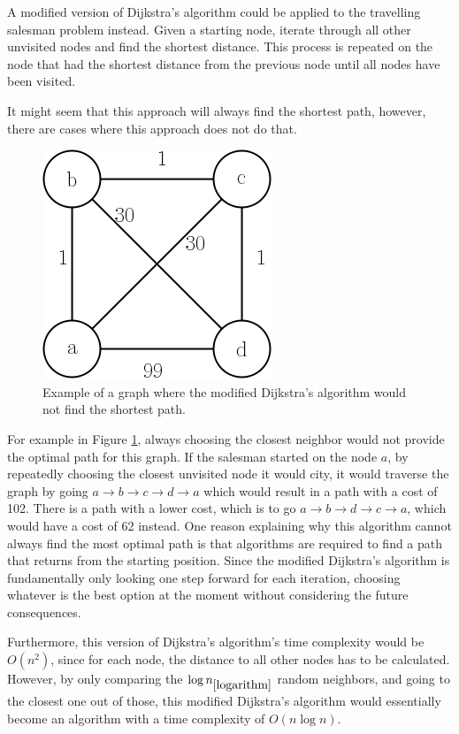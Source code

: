 \documentclass{article}
\begin{document}
\noindent
A modified version of Dijkstra's algorithm could be applied to the travelling salesman problem instead. Given a starting node, iterate through all other unvisited nodes and find the shortest distance. This process is repeated on the node that had the shortest distance from the previous node until all nodes have been visited. 

\noindent
It might seem that this approach will always find the shortest path, however, there are cases where this approach does not do that. 

\begin{figure}[ht]
     \centering
     \includegraphics[scale=0.5]{docs/pictures/dijkstras.png}
     \caption{Example of a graph where the modified Dijkstra's algorithm would not find the shortest path.}
     \label{Figure:CounterExampleDijkstras}
\end{figure}
\noindent
For example in Figure \ref{Figure:CounterExampleDijkstras}, always choosing the closest neighbor would not provide the optimal path for this graph. If the salesman started on the node $a$, by repeatedly choosing the closest unvisited node it would city, it would traverse the graph by going $a \rightarrow b \rightarrow c \rightarrow d \rightarrow a$ which would result in a path with a cost of 102. There is a path with a lower cost, which is to go $a \rightarrow b \rightarrow d \rightarrow c \rightarrow a$, which would have a cost of 62 instead. One reason explaining why this algorithm cannot always find the most optimal path is that algorithms are required to find a path that returns from the starting position. Since the modified Dijkstra's algorithm is fundamentally only looking one step forward for each iteration, choosing whatever is the best option at the moment without considering the future consequences.

\noindent
Furthermore, this version of Dijkstra's algorithm's time complexity would be $O(n^2)$, since for each node, the distance to all other nodes has to be calculated. However, by only comparing the $\log{n}_{\ref{logarithm}}$ random neighbors, and going to the closest one out of those, this modified Dijkstra's algorithm would essentially become an algorithm with a time complexity of $O(n \log{n})$. 
\end{document}
